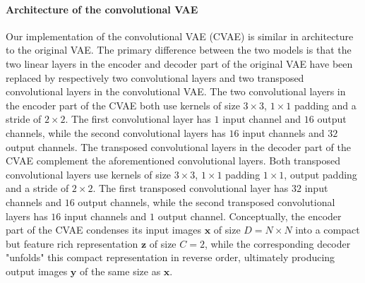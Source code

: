 
\paragraph{Architecture of the convolutional VAE}
Our implementation of the convolutional VAE  (CVAE) is similar in architecture to the original VAE\@. The primary difference between the two models is that the two linear layers in the encoder and decoder part of the original VAE have been replaced by respectively two convolutional layers and two transposed convolutional layers in the convolutional VAE\@. The two convolutional layers in the encoder part of the CVAE both use kernels of size $3\times 3$, $1\times 1$ padding and a stride of $2\times2$. The first convolutional layer has $1$ input channel and $16$ output channels, while the second convolutional layers has $16$ input channels and $32$ output channels. \iffalse As such, each convolutional layer decreases the spatial dimensions of their input by a factor of $2$, and the second convolutional layer additionally increases the feature dimension of its input by a factor $2$ to offset the loss in spatial dimensions. \fi The transposed convolutional layers in the decoder part of the CVAE complement the aforementioned convolutional layers. Both transposed convolutional layers use kernels of size $3\times3$, $1\times 1$ padding $1\times 1$, output padding and a stride of $2\times 2$. The first transposed convolutional layer has $32$ input channels and $16$ output channels, while the second transposed convolutional layers has $16$ input channels and $1$ output channel. \iffalse As such, each transposed convolutional layers "undoes" the spatial reduction produced by a corresponding prior convolutional layer by upsampling the spatial dimensions of its input with a factor of $2$. \fi Conceptually, the encoder part of the CVAE condenses its input images $\bm{x}$ of size $D = N \times N$ into a compact but feature rich representation $\bm{z}$ of size $C = 2$, while the corresponding decoder "unfolds" this compact representation in reverse order, ultimately producing output images $\bm{y}$ of the same size as $\bm{x}$. 
